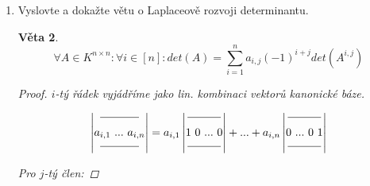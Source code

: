 \documentclass[10pt,a4paper]{article}
\theoremstyle{plain}
\newtheorem{veta}{Věta}
\theoremstyle{definition}
\begin{document}
\begin{enumerate}
\begin{veta}
\begin{proof}
\begin{enumerate}[label=(\alph*)]
Z těchto dvou lze odvodit zbylé dvě operace.

\hfill

Rozložíme regulární A na elementární matice $A = E_1E_2 ... E_k$:

\begin{align*}
det(AB) &= det(E_1E_2 ... E_kB) = det(E_1)det(E_2 ... E_kB) = ... = \\
&=  det(E_1)det(E_2) ... det(E_k)det(B) = det(E_1)det(E_2) ... det(E_{k-1}E_k)det(B) = ... = \\
&= det(E_1E_2 ... E_k)det(B) \\
&= det(A)det(B)
\end{align*}

\end{enumerate}
\end{proof}
\end{veta}

\item Vyslovte a dokažte větu o Laplaceově rozvoji determinantu.

\begin{veta}
\[ \forall A \in K^{n \times n}: \forall i \in [n]: det(A) = \sum_{i=1}^n a_{i,j}(-1)^{i+j}det(A^{i,j})\]
\begin{proof}
$i$-tý řádek vyjádříme jako lin. kombinaci vektorů kanonické báze.

\[ \begin{vmatrix}
\rule[1ex]{3.5em}{0.4pt}\\
a_{i,1}\  ...\  a_{i,n} \\
\rule[.5ex]{3.5em}{0.4pt}
\end{vmatrix} =
a_{i,1}\begin{vmatrix}
\rule[1ex]{3em}{0.4pt}\\
1\ 0\ ...\ 0 \\
\rule[.5ex]{3em}{0.4pt}
\end{vmatrix} + ... + 
a_{i,n}\begin{vmatrix}
\rule[1ex]{3em}{0.4pt}\\
0\ ...\ 0\ 1 \\
\rule[.5ex]{3em}{0.4pt}
\end{vmatrix} \]

Pro $j$-tý člen:


\end{proof}
\end{veta}
\end{enumerate}
\end{document}
